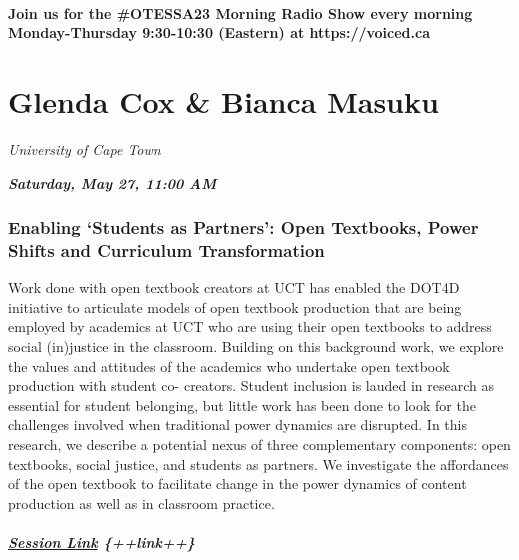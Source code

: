 \documentclass[
]{book}
\begin{document}
\begin{protip}
\hypertarget{join-us-for-the-otessa23-morning-radio-show-every-morning-monday-thursday-930-1030-eastern-at-httpsvoiced.ca}{%
\paragraph{Join us for the \#OTESSA23 Morning Radio Show every morning
Monday-Thursday 9:30-10:30 (Eastern) at
https://voiced.ca}\label{join-us-for-the-otessa23-morning-radio-show-every-morning-monday-thursday-930-1030-eastern-at-httpsvoiced.ca}}
\end{protip}

\hypertarget{glenda-cox-bianca-masuku}{%
\section*{Glenda Cox \& Bianca Masuku}\label{glenda-cox-bianca-masuku}}

\emph{University of Cape Town}

\textbf{\emph{Saturday, May 27, 11:00 AM}}

\begin{keynote}
\hypertarget{enabling-students-as-partners-open-textbooks-power-shifts-and-curriculum-transformation}{%
\subsubsection*{Enabling `Students as Partners': Open Textbooks, Power
Shifts and Curriculum
Transformation}\label{enabling-students-as-partners-open-textbooks-power-shifts-and-curriculum-transformation}}

Work done with open textbook creators at UCT has enabled the DOT4D
initiative to articulate models of open textbook production that are
being employed by academics at UCT who are using their open textbooks to
address social (in)justice in the classroom. Building on this background
work, we explore the values and attitudes of the academics who undertake
open textbook production with student co- creators. Student inclusion is
lauded in research as essential for student belonging, but little work
has been done to look for the challenges involved when traditional power
dynamics are disrupted. In this research, we describe a potential nexus
of three complementary components: open textbooks, social justice, and
students as partners. We investigate the affordances of the open
textbook to facilitate change in the power dynamics of content
production as well as in classroom practice.

\hypertarget{session-link-link}{%
\subparagraph{\texorpdfstring{\href{}{Session Link}
\{++link++\}}{Session Link \{++link++\}}}\label{session-link-link}}
\end{keynote}
\end{document}
